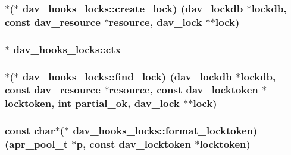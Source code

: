 \subsubsection[{\texorpdfstring{create\+\_\+lock}{create_lock}}]{$\ast$($\ast$ dav\+\_\+hooks\+\_\+locks\+::create\+\_\+lock) ({\bf dav\+\_\+lockdb} $\ast${\bf lockdb}, const {\bf dav\+\_\+resource} $\ast${\bf resource}, {\bf dav\+\_\+lock} $\ast$$\ast${\bf lock})}\hypertarget{structdav__hooks__locks_a82e887ab1f259130daf9ebe87347f47c}{}\label{structdav__hooks__locks_a82e887ab1f259130daf9ebe87347f47c}
\subsubsection[{\texorpdfstring{ctx}{ctx}}]{$\ast$ dav\+\_\+hooks\+\_\+locks\+::ctx}\hypertarget{structdav__hooks__locks_a407c2e041b6373cdd3aa01685821f376}{}\label{structdav__hooks__locks_a407c2e041b6373cdd3aa01685821f376}
\subsubsection[{\texorpdfstring{find\+\_\+lock}{find_lock}}]{$\ast$($\ast$ dav\+\_\+hooks\+\_\+locks\+::find\+\_\+lock) ({\bf dav\+\_\+lockdb} $\ast${\bf lockdb}, const {\bf dav\+\_\+resource} $\ast${\bf resource}, const {\bf dav\+\_\+locktoken} $\ast${\bf locktoken}, {\bf int} partial\+\_\+ok, {\bf dav\+\_\+lock} $\ast$$\ast${\bf lock})}\hypertarget{structdav__hooks__locks_a5941264a3e041a9798f8cf538bb2f4dd}{}\label{structdav__hooks__locks_a5941264a3e041a9798f8cf538bb2f4dd}
\subsubsection[{\texorpdfstring{format\+\_\+locktoken}{format_locktoken}}]{\setlength{\rightskip}{0pt plus 5cm}const char$\ast$($\ast$ dav\+\_\+hooks\+\_\+locks\+::format\+\_\+locktoken) ({\bf apr\+\_\+pool\+\_\+t} $\ast${\bf p}, const {\bf dav\+\_\+locktoken} $\ast${\bf locktoken})}\hypertarget{structdav__hooks__locks_a2a0a2169e202d658d9afc9e2b8b53238}{}\label{structdav__hooks__locks_a2a0a2169e202d658d9afc9e2b8b53238}
